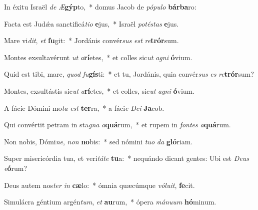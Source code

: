 \item In éxitu Israël \textit{de} \textit{Æ}\textbf{gýp}to,~* domus Jacob de \textit{pó}\textit{pu}\textit{lo} \textbf{bár}\textbf{ba}ro:

\item Facta est Judǽa sanctificá\textit{ti}\textit{o} \textbf{e}jus,~* Israël \textit{pot}\textit{és}\textit{tas} \textbf{e}jus.

\item Mare vi\textit{dit}, \textit{et} \textbf{fu}git:~* Jordánis convér\textit{sus} \textit{est} \textit{re}\textbf{trór}sum.

\item Montes exsultavérunt \textit{ut} \textit{a}\textbf{rí}etes,~* et colles sic\textit{ut} \textit{a}\textit{gni} \textbf{ó}vium.

\item Quid est tibi, mare, \textit{quod} \textit{fu}\textbf{gís}ti:~* et tu, Jordánis, quia convér\textit{sus} \textit{es} \textit{re}\textbf{trór}sum?

\item Montes, exsultástis sic\textit{ut} \textit{a}\textbf{rí}etes,~* et colles, sic\textit{ut} \textit{a}\textit{gni} \textbf{ó}vium.

\item A fácie Dómini mo\textit{ta} \textit{est} \textbf{ter}ra,~* a fáci\textit{e} \textit{De}\textit{i} \textbf{Ja}cob.

\item Qui convértit petram in sta\textit{gna} \textit{a}\textbf{quá}rum,~* et rupem in \textit{fon}\textit{tes} \textit{a}\textbf{quá}rum.

\item Non nobis, Dómi\textit{ne}, \textit{non} \textbf{no}bis:~*  sed nómini \textit{tu}\textit{o} \textit{da} \textbf{gló}riam.

\item Super misericórdia tua, et veri\textit{tá}\textit{te} \textbf{tu}a:~* nequándo dicant gentes: Ubi est \textit{De}\textit{us} \textit{e}\textbf{ó}rum?

\item Deus autem nos\textit{ter} \textit{in} \textbf{cæ}lo:~* ómnia quæcúmque \textit{vó}\textit{lu}\textit{it}, \textbf{fe}cit.

\item Simulácra géntium argén\textit{tum}, \textit{et} \textbf{au}rum,~* ópera \textit{má}\textit{nu}\textit{um} \textbf{hó}minum.

